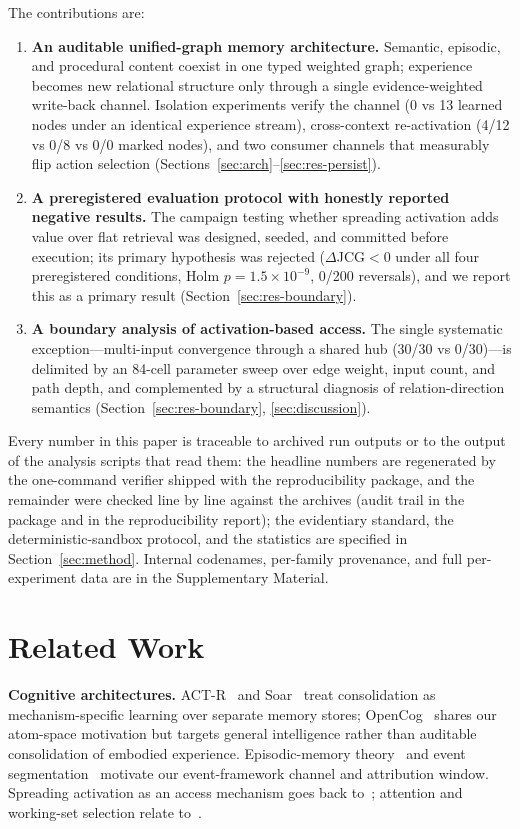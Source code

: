 \documentclass[10pt]{article}
\begin{document}
The contributions are:
\begin{enumerate}
\item \textbf{An auditable unified-graph memory architecture.} Semantic, episodic, and procedural content coexist in one typed weighted graph; experience becomes new relational structure only through a single evidence-weighted write-back channel. Isolation experiments verify the channel (0 vs 13 learned nodes under an identical experience stream), cross-context re-activation (4/12 vs 0/8 vs 0/0 marked nodes), and two consumer channels that measurably flip action selection (Sections~\ref{sec:arch}--\ref{sec:res-persist}).
\item \textbf{A preregistered evaluation protocol with honestly reported negative results.} The campaign testing whether spreading activation adds value over flat retrieval was designed, seeded, and committed before execution; its primary hypothesis was rejected ($\Delta$JCG${<}0$ under all four preregistered conditions, Holm $p{=}1.5\times10^{-9}$, 0/200 reversals), and we report this as a primary result (Section~\ref{sec:res-boundary}).
\item \textbf{A boundary analysis of activation-based access.} The single systematic exception---multi-input convergence through a shared hub (30/30 vs 0/30)---is delimited by an 84-cell parameter sweep over edge weight, input count, and path depth, and complemented by a structural diagnosis of relation-direction semantics (Section~\ref{sec:res-boundary}, \ref{sec:discussion}).
\end{enumerate}

Every number in this paper is traceable to archived run outputs or to the output of the analysis scripts that read them: the headline numbers are regenerated by the one-command verifier shipped with the reproducibility package, and the remainder were checked line by line against the archives (audit trail in the package and in the reproducibility report); the evidentiary standard, the deterministic-sandbox protocol, and the statistics are specified in Section~\ref{sec:method}. Internal codenames, per-family provenance, and full per-experiment data are in the Supplementary Material.

\section{Related Work}
\label{sec:related}

\textbf{Cognitive architectures.} ACT-R~\citep{anderson2004integrated} and Soar~\citep{laird2012soar} treat consolidation as mechanism-specific learning over separate memory stores; OpenCog~\citep{hart2008opencog} shares our atom-space motivation but targets general intelligence rather than auditable consolidation of embodied experience. Episodic-memory theory~\citep{tulving1983elements,baddeley2000episodic} and event segmentation~\citep{zacks2007event,schacter2007remembering} motivate our event-framework channel and attribution window. Spreading activation as an access mechanism goes back to~\citet{collins1975spreading}; attention and working-set selection relate to~\citet{itti2001computational,posner1980orienting,cowan2001magical}.
\end{document}

